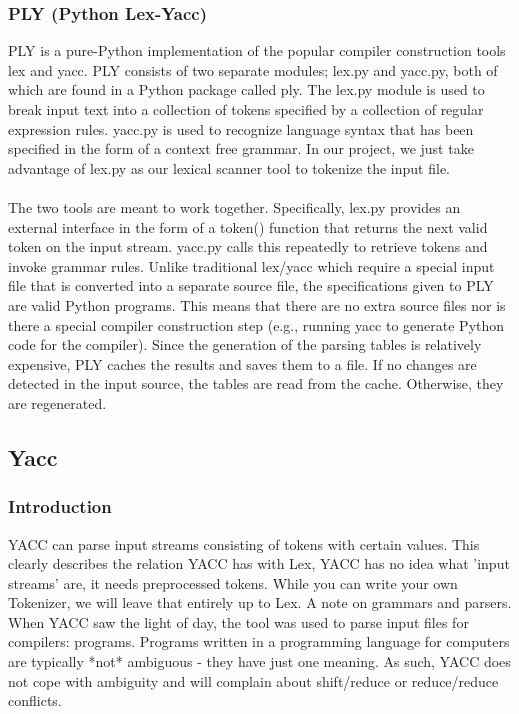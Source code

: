 \documentclass{article}
\begin{document}
\subsubsection{ PLY (Python Lex-Yacc) }
PLY is a pure-Python implementation of the popular compiler construction tools lex and yacc.  PLY consists of two separate modules; lex.py and yacc.py, both of which are found in a Python package called ply. The lex.py module is used to break input text into a collection of tokens specified by a collection of regular expression rules. yacc.py is used to recognize language syntax that has been specified in the form of a context free grammar. In our project, we just take advantage of lex.py as our lexical scanner tool to  tokenize the input file.\\
\\
The two tools are meant to work together. Specifically, lex.py provides an external interface in the form of a token() function that returns the next valid token on the input stream. yacc.py calls this repeatedly to retrieve tokens and invoke grammar rules. 
Unlike traditional lex/yacc which require a special input file that is converted into a separate source file, the specifications given to PLY are valid Python programs. This means that there are no extra source files nor is there a special compiler construction step (e.g., running yacc to generate Python code for the compiler). Since the generation of the parsing tables is relatively expensive, PLY caches the results and saves them to a file. If no changes are detected in the input source, the tables are read from the cache. Otherwise, they are regenerated.

\subsection{Yacc}
\subsubsection{Introduction}
YACC can parse input streams consisting of tokens with certain values. This clearly describes the relation
YACC has with Lex, YACC has no idea what ’input streams’ are, it needs preprocessed tokens. While you
can write your own Tokenizer, we will leave that entirely up to Lex.
A note on grammars and parsers. When YACC saw the light of day, the tool was used to parse input files
for compilers: programs. Programs written in a programming language for computers are typically *not*
ambiguous - they have just one meaning. As such, YACC does not cope with ambiguity and will complain
about shift/reduce or reduce/reduce conflicts. 
\end{document}
